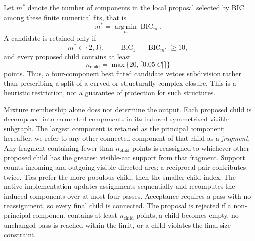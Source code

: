 \documentclass[pdflatex,sn-basic,Numbered]{sn-jnl}
\newcommand{\argmin}{\operatorname*{arg\,min}}
\begin{document}
Let $m^*$ denote the number of components in the local proposal selected by
BIC among these finite numerical fits, that is,
\begin{equation}
m^*=\argmin_m\operatorname{BIC}_m.
\end{equation}
A candidate is retained only if
\begin{equation}
m^*\in\{2,3\},
\qquad
\operatorname{BIC}_1-\operatorname{BIC}_{m^*}\geq10,
\label{eq:pruning_acceptance}
\end{equation}
and every proposed child contains at least
\begin{equation}
n_{\mathrm{child}}
=
\max\{20,\lceil0.05|C|\rceil\}
\label{eq:pruning_child_size}
\end{equation}
points. Thus, a four-component best fitted candidate vetoes subdivision rather
than prescribing a split of a curved or structurally complex closure. This is
a heuristic restriction, not a guarantee of protection for such structures.

Mixture membership alone does not determine the output. Each proposed child
is decomposed into connected components in its induced symmetrised visible
subgraph. The largest component is retained as the principal component; hereafter,
we refer to any other connected component of that child as a \emph{fragment}.
Any fragment containing fewer than $n_{\mathrm{child}}$ points is reassigned
to whichever other proposed child has the greatest visible-arc support from
that fragment. Support counts incoming and outgoing visible directed arcs;
a reciprocal pair contributes twice. Ties prefer the more populous child,
then the smaller child index. The native implementation updates assignments
sequentially and recomputes the induced components over at most four passes.
Acceptance requires a pass with no reassignment, so every final child is
connected. The proposal is rejected if a non-principal component contains
at least $n_{\mathrm{child}}$ points, a child becomes empty, no unchanged pass
is reached within the limit, or a child violates the final size constraint.
\end{document}
